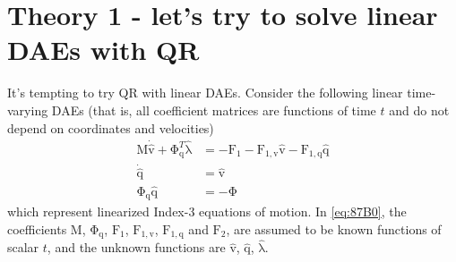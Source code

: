 \documentclass{scrartcl}
\newcommand\mMat[1]{\ensuremath{\boldsymbol{\mathrm{#1}}}}
\newcommand\mVec[1]{\ensuremath{\boldsymbol{\mathrm{#1}}}}
\newcommand\mOf[1]{\left({#1}\right)}
\begin{document}
\section{Theory 1 - let's try to solve linear DAEs with QR}

It's tempting to try QR with linear DAEs. Consider the following linear
time-varying DAEs (that is, all coefficient matrices are functions of time $t$
and do not depend on coordinates and velocities)
\begin{subequations}
\label{eq:87B0}
\begin{align}
    \mMat{M} \mVec{\dot {\hat v}}
  + \mMat{\Phi}_{\mVec{q}}^T \mVec{\hat \lambda}
  & = - \mVec{F}_1  - \mMat{F}_{1,\mVec{v}} \mVec{\hat v}
                    - \mMat{F}_{1,\mVec{q}} \mVec{\hat q}
  \label{eq:G35J}
\\
  \mVec{\dot {\hat q}} & = \mVec{\hat v}
  \label{eq:U58A}
\\
  \mMat{\Phi}_{\mVec{q}} \mVec{\hat q} & = - \mVec{\Phi}
  \label{eq:4LWR}
\end{align}
\end{subequations}
which represent linearized Index-3 equations of motion. In \eqref{eq:87B0}, the
coefficients $\mMat{M}$, $\mMat{\Phi}_{\mVec{q}}$, $\mVec{F}_1$,
$\mMat{F}_{1,\mVec{v}}$, $\mMat{F}_{1,\mVec{q}}$ and  $\mVec{F}_2$, are assumed
to be known functions of scalar $t$, and the unknown functions are $\mVec{\hat
v}$, $\mVec{\hat q}$, $\mVec{\hat \lambda}$.
\end{document}
